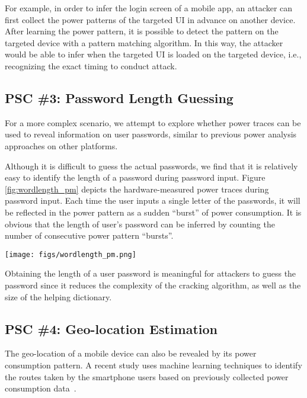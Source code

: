\documentclass{sig-alternate}
\begin{document}
For example, in order to infer the login screen of a mobile app, an attacker can first collect the power patterns of the targeted UI in advance on another device. After learning the power pattern, it is possible to detect the pattern on the targeted device with a pattern matching algorithm. In this way, the attacker would be able to infer when the targeted UI is loaded on the targeted device, i.e., recognizing the exact timing to conduct attack.

\subsection{PSC \#3: Password Length Guessing}

For a more complex scenario, we attempt to explore whether power traces can be used to reveal information on user passwords, similar to previous power analysis approaches on other platforms.

Although it is difficult to guess the actual passwords, we find that it is relatively easy to identify the length of a password during password input. Figure \ref{fig:wordlength_pm} depicts the hardware-measured power traces during password input. Each time the user inputs a single letter of the passwords, it will be reflected in the power pattern as a sudden ``burst'' of power consumption. It is obvious that the length of user's password can be inferred by counting the number of consecutive power pattern ``bursts''.

\begin{figure*}[t]
\centering
\texttt{[image: figs/wordlength\_pm.png]}
\caption{Power patterns from hardware measurements when inputting passwords with different lengths.}
\label{fig:wordlength_pm}
\end{figure*}

Obtaining the length of a user password is meaningful for attackers to guess the password since it reduces the complexity of the cracking algorithm, as well as the size of the helping dictionary.

\subsection{PSC \#4: Geo-location Estimation}

The geo-location of a mobile device can also be revealed by its power consumption pattern. A recent study uses machine learning techniques to identify the routes taken by the smartphone users based on previously collected power consumption data~\cite{MichalevskyNSB15}.
\end{document}
